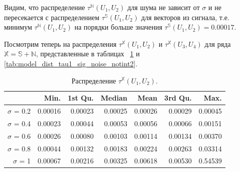 \documentclass[specialist,
               substylefile = spbu.rtx,
               subf,href,colorlinks=true, 12pt]{disser}
\begin{document}
Видим, что распределение $\tau^{\mathbb{N}}(U_1, U_2)$ для шума не зависит от $\sigma$ и не пересекается с распределением $\tau^{\mathbb{S}}(U_1, U_2)$ для векторов из сигнала, т.е. минимум $\tau^{\mathbb{N}}(U_1, U_2)$ на порядки больше значения $\tau^{\mathbb{S}}(U_1, U_2) = 0.00017$.
%
%


Посмотрим теперь на распределения  $\tau^{\mathbb{X}}(U_1, U_2)$ и  $\tau^{\mathbb{X}}(U_3, U_4)$ для ряда $\mathbb{X} = \mathbb{S} + \mathbb{N}$, представленные в таблицах ~\ref{tab:model_dist_tau1_sig_noise_notint} и \ref{tab:model_dist_tau1_sig_noise_notint2}.

\begin{table}[hhh!]
\caption{Распределение $\tau^{\mathbb{X}}(U_1, U_2)$.}
\centering
\begin{tabular}{rrrrrrr}
  \hline
 & Min. & 1st Qu. & Median & Mean & 3rd Qu. & Max. \\
  \hline
$\sigma$ = 0.2 & 0.00016 & 0.00023 & 0.00025 & 0.00026 & 0.00029 & 0.00045 \\
  $\sigma$ = 0.4 & 0.00023 & 0.00044 & 0.00053 & 0.00056 & 0.00066 & 0.00151 \\
  $\sigma$ = 0.6 & 0.00026 & 0.00080 & 0.00103 & 0.00114 & 0.00134 & 0.00370 \\
  $\sigma$ = 0.8 & 0.00044 & 0.00132 & 0.00183 & 0.00224 & 0.00263 & 0.03314 \\
  $\sigma$ = 1 & 0.00067 & 0.00216 & 0.00325 & 0.00618 & 0.00530 & 0.54539 \\
   \hline
\end{tabular}
\label{tab:model_dist_tau1_sig_noise_notint}
\end{table}
\end{document}
